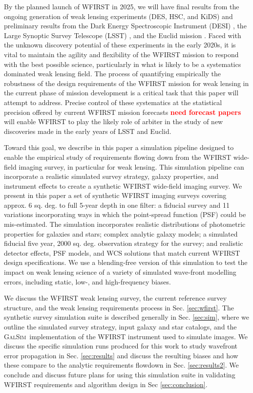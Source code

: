 \documentclass[aps,prd, amsmath,amssymb,superscriptaddress,showkeys,nofootinbib,reprint,preprintnumbers]{revtex4-1}
\newcommand{\verify}[1]{\textcolor{red}{\textbf{{#1}}}}
\newcommand{\galsim}{\textsc{GalSim}}
\begin{document}
By the planned launch of WFIRST in 2025, we will have final results from the ongoing generation of weak lensing experiments (DES, HSC, and KiDS) and preliminary results from the Dark Energy Spectroscopic Instrument (DESI) \cite{desi}, the Large Synoptic Survey Telescope (LSST) \cite{lsst}, and the Euclid mission \cite{euclid}. 
Faced with the unknown discovery potential of these experiments in the early 2020s, it is vital to maintain the agility and flexibility of the WFIRST mission to respond with the best possible science, particularly in what is likely to be a systematics dominated weak lensing field.
The process of quantifying empirically the robustness of the design requirements of the WFIRST mission for weak lensing in the current phase of mission development is a critical task that this paper will attempt to address. 
Precise control of these systematics at the statistical precision offered by current WFIRST mission forecasts \cite{} \verify{need forecast papers} will enable WFIRST to play the likely role of arbiter in the study of new discoveries made in the early years of LSST and Euclid.

Toward this goal, we describe in this paper a simulation pipeline designed to enable the empirical study of requirements flowing down from the WFIRST wide-field imaging survey, in particular for weak lensing. This simulation pipeline can incorporate a realistic simulated survey strategy, galaxy properties, and instrument effects to create a synthetic WFIRST wide-field imaging survey. We present in this paper a set of synthetic WFIRST imaging surveys covering approx. 6 sq. deg. to full 5-year depth in one filter: a fiducial survey and 11 variations incorporating ways in which the point-spread function (PSF) could be mis-estimated. 
The simulation incorporates realistic distributions of photometric properties for galaxies and stars; complex analytic galaxy models; a simulated fiducial five year, 2000 sq. deg. observation strategy for the survey; and realistic detector effects, PSF models, and WCS solutions that match current WFIRST design specifications. 
We use a blending-free version of this simulation to test the impact on weak lensing science of a variety of simulated wave-front modelling errors, including static, low-, and high-frequency biases. 

We discuss the WFIRST weak lensing survey, the current reference survey structure, and the weak lensing requirements process in Sec. \ref{sec:wfirst}. The  synthetic survey simulation suite is described generally in Sec. \ref{sec:sim}, where we outline the simulated survey strategy, input galaxy and star catalogs, and the \galsim\ implementation of the WFIRST instrument used to simulate images. We discuss the specific simulation runs produced for this work to study wavefront error propagation in Sec. \ref{sec:results} and discuss the resulting biases and how these compare to the analytic requirements flowdown in Sec. \ref{sec:results2}. We conclude and discuss future plans for using this simulation suite in validating WFIRST requirements and algorithm design in Sec \ref{sec:conclusion}. 
\end{document}

